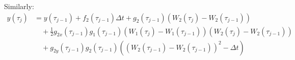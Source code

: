 \begin{frame}
Similarly:
\begin{equation*}
	\begin{split}
	y(\tau_{j})&=y(\tau_{j-1})+f_2(\tau_{j-1})\Delta t+g_2(\tau_{j-1})(W_2(\tau_{j})-W_2(\tau_{j-1}))\\
	&\quad +\frac{1}{2}g_{2x}(\tau_{j-1})g_{1}(\tau_{j-1})(W_1(\tau_{j})-W_1(\tau_{j-1}))(W_2(\tau_{j})-W_2(\tau_{j-1}))\\
	&\quad +g_{2y}(\tau_{j-1})g_2(\tau_{j-1})((W_2(\tau_{j-1})-W_2(\tau_{j-1}))^2-\Delta t)\\
	\end{split}
	\end{equation*}
\end{frame}




